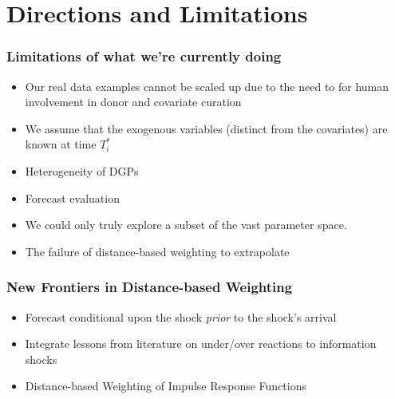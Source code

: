 \documentclass[9pt]{beamer}
\theoremstyle{definition}
\begin{document}
        


\section{Directions and Limitations}

\begin{frame}
    \frametitle{Limitations of what we're currently doing}
    \begin{itemize}
        \item Our real data examples cannot be scaled up due to the need to for human involvement in donor and covariate curation
        \item We assume that the exogenous variables (distinct from the covariates) are known at time $T_{i}^{*}$
        \item Heterogeneity of DGPs
        \item Forecast evaluation
        \item We could only truly explore a subset of the vast parameter space.
        \item The failure of distance-based weighting to extrapolate
    \end{itemize}
\end{frame}

\begin{frame}
    \frametitle{New Frontiers in Distance-based Weighting}
    \begin{itemize}
        \item Forecast conditional upon the shock \textit{prior} to the shock's arrival
        \item Integrate lessons from literature on under/over reactions to information shocks \parencite[][]{jiang2017information}
        \item{Distance-based Weighting of Impulse Response Functions}
        \end{itemize}
\end{frame}
\end{document}
